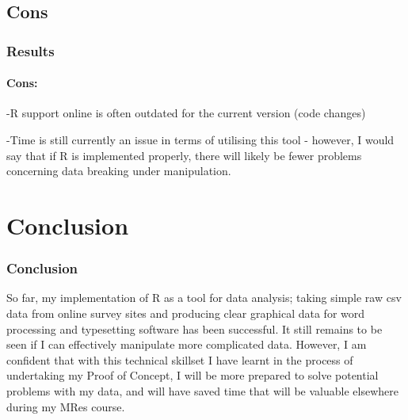 \documentclass{beamer}
\begin{document}
\subsection{Cons}
\begin{frame}
\frametitle{Results}
\framesubtitle{Cons:}
\item -R support online is often outdated for the current version (code changes)
\item -Time is still currently an issue in terms of utilising this tool - however, I would say that if R is implemented properly, there will likely be fewer problems concerning data breaking under manipulation. 
\end{frame}

\section{Conclusion}
\begin{frame}
\frametitle{Conclusion}
So far, my implementation of R as a tool for data analysis; taking simple raw csv data from online survey sites and producing clear graphical data for word processing and typesetting software has been successful. It still remains to be seen if I can effectively manipulate more complicated data. However, I am confident that with this technical skillset I have learnt in the process of undertaking my Proof of Concept, I will be more prepared to solve potential problems with my data, and will have saved time that will be valuable elsewhere during my MRes course.
\end{frame}

\end{document}
